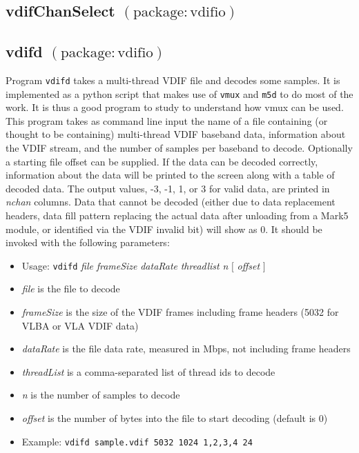 
\subsection{vdifChanSelect {\small $\mathrm{(package: vdifio)}$}} \label{sec:vdifChanSelect}





\subsection{vdifd {\small $\mathrm{(package: vdifio)}$}} \label{sec:vdifd}

Program {\tt vdifd} takes a multi-thread VDIF file and decodes some samples.
It is implemented as a python script that makes use of {\tt vmux} and {\tt m5d} to do most of the work.
It is thus a good program to study to understand how vmux can be used.
This program takes as command line input the name of a file containing (or thought to be containing) multi-thread VDIF baseband data, information about the VDIF stream, and the number of samples per baseband to decode.
Optionally a starting file offset can be supplied.
If the data can be decoded correctly, information about the data will be printed to the screen along with a table of decoded data.
The output values, -3, -1, 1, or 3 for valid data, are printed in {\em nchan} columns.
Data that cannot be decoded (either due to data replacement headers, data fill pattern replacing the actual data after unloading from a Mark5 module, or identified via the VDIF invalid bit) will show as 0.
It should be invoked with the following parameters:

\begin{itemize}
\item[] Usage: {\tt vdifd} {\em file} {\em frameSize} {\em dataRate} {\em threadlist} {\em n} $[$ {\em offset} $]$ 
\item[] {\em file} is the file to decode
\item[] {\em frameSize} is the size of the VDIF frames including frame headers (5032 for VLBA or VLA VDIF data)
\item[] {\em dataRate} is the file data rate, measured in Mbps, not including frame headers
\item[] {\em threadList} is a comma-separated list of thread ids to decode
\item[] {\em n} is the number of samples to decode
\item[] {\em offset} is the number of bytes into the file to start decoding (default is 0)
\item[] Example: {\tt vdifd sample.vdif 5032 1024 1,2,3,4 24}
\end{itemize}

